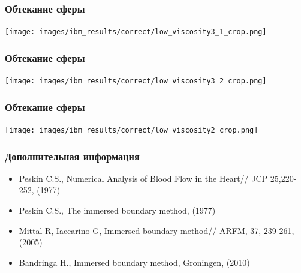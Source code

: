 \documentclass[14pt]{beamer}
\begin{document}
\begin{frame}
\frametitle{Обтекание сферы}
    \begin{center}
    \texttt{[image: images/ibm\_results/correct/low\_viscosity3\_1\_crop.png]}
    \end{center}
\end{frame}

\begin{frame}
\frametitle{Обтекание сферы}
    \begin{center}
    \texttt{[image: images/ibm\_results/correct/low\_viscosity3\_2\_crop.png]}
    \end{center}
\end{frame}

\begin{frame}
\frametitle{Обтекание сферы}
    \begin{center}
    \texttt{[image: images/ibm\_results/correct/low\_viscosity2\_crop.png]}
    \end{center}
\end{frame}

\begin{frame}
\frametitle{Дополнительная информация}
    \begin{itemize}
        \item Peskin C.S., Numerical Analysis of Blood Flow in the Heart// JCP 25,220-252, (1977)
        \item Peskin C.S., The immersed boundary method, (1977)
        \item Mittal R, Iaccarino G, Immersed boundary method// ARFM, 37, 239-261, (2005)
        \item Bandringa H., Immersed boundary method, Groningen, (2010)
    \end{itemize}
\end{frame}
\end{document}
